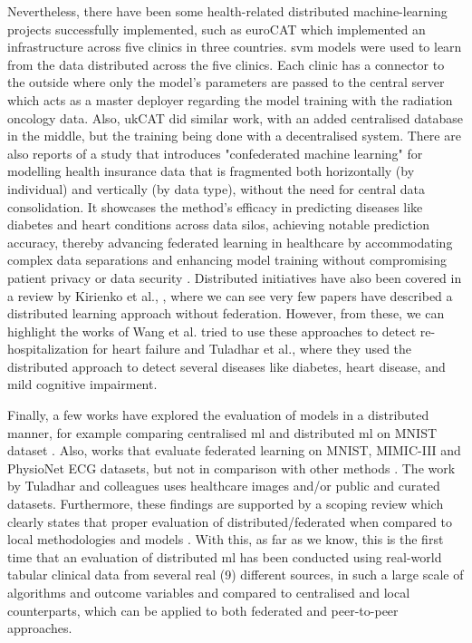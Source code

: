Nevertheless, there have been some health-related distributed machine-learning projects successfully implemented, such as euroCAT \cite{eurocat} which implemented an infrastructure across five clinics in three countries. \ac{svm} models were used to learn from the data distributed across the five clinics. Each clinic has a connector to the outside where only the model's parameters are passed to the central server which acts as a master deployer regarding the model training with the radiation oncology data. Also, ukCAT \cite{ukcat} did similar work, with an added centralised database in the middle, but the training being done with a decentralised system. There are also reports of a study that introduces "confederated machine learning" for modelling health insurance data that is fragmented both horizontally (by individual) and vertically (by data type), without the need for central data consolidation. It showcases the method's efficacy in predicting diseases like diabetes and heart conditions across data silos, achieving notable prediction accuracy, thereby advancing federated learning in healthcare by accommodating complex data separations and enhancing model training without compromising patient privacy or data security \cite{liuConfederatedLearningHealthcare2022}. Distributed initiatives have also been covered in a review by Kirienko et al., \cite{kirienkoDistributedLearningReliable2021a}, where we can see very few papers have described a distributed learning approach without federation. However, from these, we can highlight the works of Wang et al. \cite{wangFastDivideandconquerSparse2019} tried to use these approaches to detect re-hospitalization for heart failure and Tuladhar et al., \cite{distributed} where they used the distributed approach to detect several diseases like diabetes, heart disease, and mild cognitive impairment.

Finally, a few works have explored the evaluation of models in a distributed manner, for example comparing  centralised \ac{ml} and distributed \ac{ml} on MNIST dataset \cite{performance_evaluation_1}. Also, works that evaluate federated learning on MNIST, MIMIC-III and PhysioNet ECG datasets, but not in comparison with other methods \cite{performance_evaluation_2}. The work by Tuladhar and colleagues \cite{distributed} uses healthcare images and/or public and curated datasets. Furthermore, these findings are supported by a scoping review which clearly states that proper  evaluation of distributed/federated when compared to local methodologies and models \cite{liFederatedDistributedLearning2023}. With this, as far as we know, this is the first time that an evaluation of distributed \ac{ml} has been conducted using real-world tabular clinical data from several real (9) different sources, in such a large scale of algorithms and outcome variables and compared to centralised and local counterparts, which can be applied to both federated and peer-to-peer approaches.